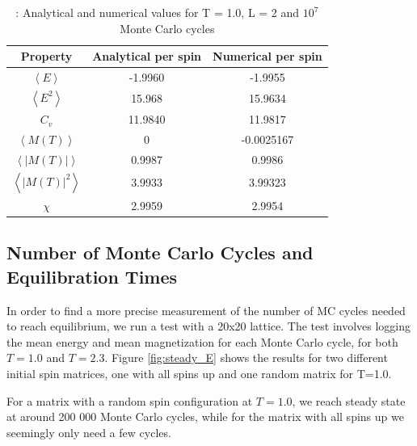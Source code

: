 \documentclass{article}
\begin{document}
	{\renewcommand{\arraystretch}{1.5}
	\begin{table}[h!]
		\caption{: Analytical and numerical values for T = 1.0, L = 2 and $10^7$ Monte Carlo cycles }
			\label{Tab: values}
			\centering
		\begin{tabular}{c c c}
			Property & Analytical per spin & Numerical per spin \\
			\hline
			$\left<E\right>$  & -1.9960 & -1.9955\\
			$\left<E^2\right>$ & 15.968  &15.9634 \\
			$C_v$ & 11.9840 & 11.9817 \\
			$\left<M(T)\right>$ & 0 & -0.0025167\\
			$\left<|M(T)|\right>$ & 0.9987 & 0.9986\\
			$\left<|M(T)|^2\right>$  & 3.9933 & 3.99323\\
			$\chi$  & 2.9959 & 2.9954\\
		\end{tabular}
	\end{table}

	\subsection{Number of Monte Carlo Cycles and Equilibration Times}
		In order to find a more precise measurement of the number of MC cycles needed to reach equilibrium, we run a test with a 20x20 lattice. The test involves logging the mean energy and mean magnetization for each Monte Carlo cycle, for both $T=1.0$ and $T=2.3$. Figure \ref{fig:steady_E} shows the results for two different initial spin matrices, one with all spins up and one random matrix for T=1.0.

		For a matrix with a random spin configuration at $T=1.0$, we reach steady state at around 200 000 Monte Carlo cycles, while for the matrix with all spins up we seemingly only need a few cycles.

}
\end{document}
